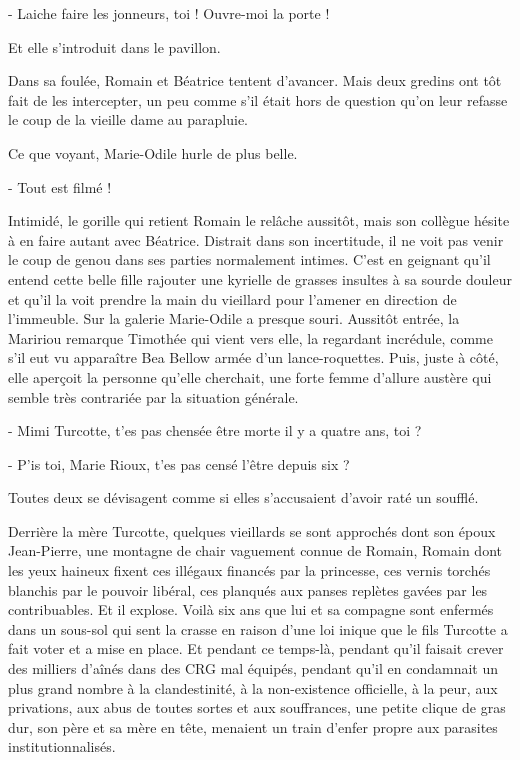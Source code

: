 - Laiche faire les jonneurs, toi ! Ouvre-moi la porte !

Et elle s’introduit dans le pavillon.

Dans sa foulée, Romain et Béatrice tentent d’avancer. Mais deux gredins ont tôt fait de les intercepter, un peu comme s’il était hors de question qu’on leur refasse le coup de la vieille dame au parapluie.

Ce que voyant, Marie-Odile hurle de plus belle.

- Tout est filmé !

Intimidé, le gorille qui retient Romain le relâche aussitôt, mais son collègue hésite à en faire autant avec Béatrice. Distrait dans son incertitude, il ne voit pas venir le coup de genou dans ses parties normalement intimes. C’est en geignant qu’il entend cette belle fille rajouter une kyrielle de grasses insultes à sa sourde douleur et qu’il la voit prendre la main du vieillard pour l’amener en direction de l’immeuble. Sur la galerie Marie-Odile a presque souri.
Aussitôt entrée, la Maririou remarque Timothée qui vient vers elle, la regardant incrédule, comme s’il eut vu apparaître Bea Bellow armée d’un lance-roquettes. Puis, juste à côté, elle aperçoit la personne qu’elle cherchait, une forte femme d’allure austère qui semble très contrariée par la situation générale.

- Mimi Turcotte, t’es pas chensée être morte il y a quatre ans, toi ?

- P’is toi, Marie Rioux, t’es pas censé l’être depuis six ?

Toutes deux se dévisagent comme si elles s’accusaient d’avoir raté un soufflé.

Derrière la mère Turcotte, quelques vieillards se sont approchés dont son époux Jean-Pierre, une montagne de chair vaguement connue de Romain, Romain dont les yeux haineux fixent ces illégaux financés par la princesse, ces vernis torchés blanchis par le pouvoir libéral, ces planqués aux panses replètes gavées par les contribuables. Et il explose. Voilà six ans que lui et sa compagne sont enfermés dans un sous-sol qui sent la crasse en raison d’une loi inique que le fils Turcotte a fait voter et a mise en place. Et pendant ce temps-là, pendant qu’il faisait crever des milliers d’aînés dans des CRG mal équipés, pendant qu’il en condamnait un plus grand nombre à la clandestinité, à la non-existence officielle, à la peur, aux privations, aux abus de toutes sortes et aux souffrances, une petite clique de gras dur, son père et sa mère en tête, menaient un train d’enfer propre aux parasites institutionnalisés.

